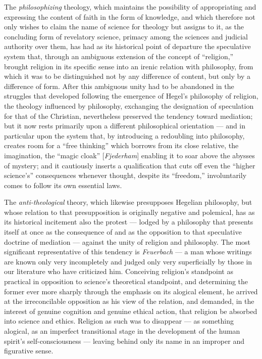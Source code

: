\documentclass[12pt,a4paper]{book}
\begin{document}
The \emph{philosophizing} theology, which maintains the possibility of
appropriating and expressing the content of faith in the form of
knowledge, and which therefore not only wishes to claim the name of
science for theology but assigns to it, as the concluding form of
revelatory science, primacy among the sciences and judicial authority
over them, has had as its historical point of departure the speculative
system that, through an ambiguous extension of the concept of
``religion,'' brought religion in its specific sense into an irenic
relation with philosophy, from which it was to be distinguished not by
any difference of content, but only by a difference of form. After
this ambiguous unity had to be abandoned in the struggles that
developed following the emergence of Hegel's philosophy of religion,
the theology influenced by philosophy, exchanging the designation of
speculation for that of the Christian, nevertheless preserved the
tendency toward mediation; but it now rests primarily upon a different
philosophical orientation --- and in particular upon the system that,
by introducing a redoubling into philosophy, creates room for a ``free
thinking'' which borrows from its close relative, the imagination, the
``magic cloak'' [\textit{Fjederham}] enabling it to soar above the
abysses of mystery; and it cautiously inserts a qualification that cuts
off even the ``higher science's'' consequences whenever thought,
despite its ``freedom,'' involuntarily comes to follow its own
essential laws.

The \emph{anti-theological} theory, which likewise presupposes Hegelian
philosophy, but whose relation to that presupposition is originally
negative and polemical, has as its historical incitement also the
protest --- lodged by a philosophy that presents itself at once as the
consequence of and as the opposition to that speculative doctrine of
mediation --- against the unity of religion and philosophy. The most
significant representative of this tendency is \emph{Feuerbach} --- a man
whose writings are known only very incompletely and judged only very
superficially by those in our literature who have criticized him.
Conceiving religion's standpoint as practical in opposition to
science's theoretical standpoint, and determining the former ever more
sharply through the emphasis on its alogical element, he arrived at
the irreconcilable opposition as his view of the relation, and
demanded, in the interest of genuine cognition and genuine ethical
action, that religion be absorbed into science and ethics. Religion as
such was to disappear --- as something alogical, as an imperfect
transitional stage in the development of the human spirit's
self-consciousness --- leaving behind only its name in an improper and
figurative sense.
\end{document}
